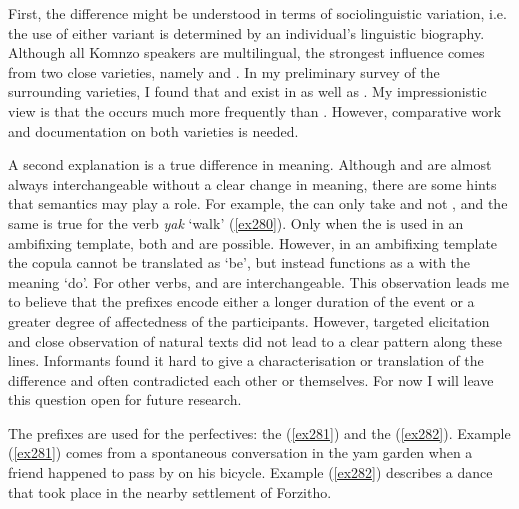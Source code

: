 First, the difference might be understood in terms of sociolinguistic variation, i.e. the use of either variant is determined by an individual's linguistic biography. Although all Komnzo speakers are multilingual, the strongest influence comes from two close varieties, namely  and . In my preliminary survey of the surrounding varieties, I found that \Betaone{} and \Betatwo{} exist in  as well as . My impressionistic view is that the \Betatwo{}  occurs much more frequently than \Betaone. However, comparative work and documentation on both varieties is needed.

A second explanation is a true difference in meaning. Although \Betaone{} and \Betatwo{} are almost always interchangeable without a clear change in meaning, there are some hints that semantics may play a role. For example, the  can only take \Betatwo{} and not \Betaone{}, and the same is true for the verb \emph{yak} `walk' (\ref{ex280}). Only when the  is used in an ambifixing template, both \Betaone{} and \Betatwo{} are possible. However, in an ambifixing template the copula cannot be translated as `be', but instead functions as a  with the meaning `do'. For other verbs, \Betaone{} and \Betatwo{} are interchangeable. This observation leads me to believe that the \Betatwo{} prefixes encode either a longer duration of the event or a greater degree of affectedness of the participants. However, targeted elicitation and close observation of natural texts did not lead to a clear pattern along these lines. Informants found it hard to give a characterisation or translation of the difference and often contradicted each other or themselves. For now I will leave this question open for future research.

The \Gam{} prefixes are used for the perfectives: the   (\ref{ex281}) and the   (\ref{ex282}). Example (\ref{ex281}) comes from a spontaneous conversation in the yam garden when a friend happened to pass by on his bicycle. Example (\ref{ex282}) describes a dance that took place in the nearby settlement of Forzitho.

